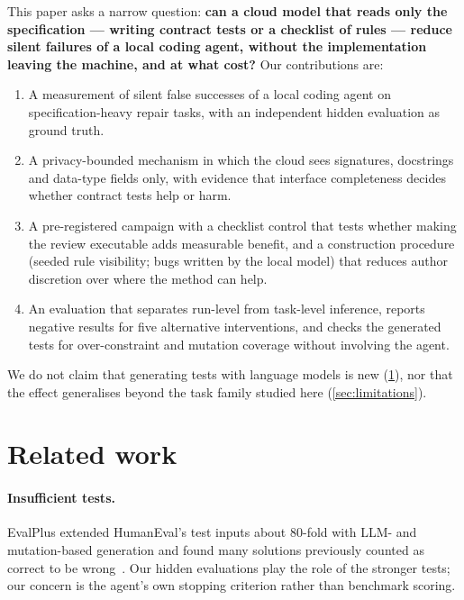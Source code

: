 \documentclass[11pt]{article}
\begin{document}
This paper asks a narrow question: \textbf{can a cloud model that reads only the specification --- writing contract tests or a checklist of rules --- reduce silent failures of a local coding agent, without the implementation leaving the machine, and at what cost?} Our contributions are:
\begin{enumerate}
\item A measurement of silent false successes of a local coding agent on specification-heavy repair tasks, with an independent hidden evaluation as ground truth.
\item A privacy-bounded mechanism in which the cloud sees signatures, docstrings and data-type fields only, with evidence that interface completeness decides whether contract tests help or harm.
\item A pre-registered campaign with a checklist control that tests whether making the review executable adds measurable benefit, and a construction procedure (seeded rule visibility; bugs written by the local model) that reduces author discretion over where the method can help.
\item An evaluation that separates run-level from task-level inference, reports negative results for five alternative interventions, and checks the generated tests for over-constraint and mutation coverage without involving the agent.
\end{enumerate}
We do not claim that generating tests with language models is new (\cref{sec:related}), nor that the effect generalises beyond the task family studied here (\cref{sec:limitations}).

\section{Related work}\label{sec:related}
\paragraph{Insufficient tests.} EvalPlus extended HumanEval's test inputs about 80-fold with LLM- and mutation-based generation and found many solutions previously counted as correct to be wrong~\citep{liu2023evalplus}. Our hidden evaluations play the role of the stronger tests; our concern is the agent's own stopping criterion rather than benchmark scoring.
\end{document}
